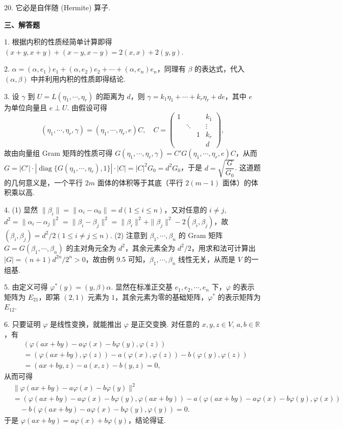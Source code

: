 \documentclass[UTF8, 12pt, fontset=fandol, oneside]{ctexart}
\begin{document}
20. 它必是自伴随 (Hermite) 算子.

\noindent\textbf{三、解答题}

1. 根据内积的性质经简单计算即得 $(x+y,x+y)+(x-y,x-y)=2(x,x)+2(y,y)$.

2. $\alpha=(\alpha,e_1)e_1+(\alpha,e_2)e_2+\cdots+(\alpha,e_n)e_n$，同理有 $\beta$ 的表达式，代入 $(\alpha,\beta)$ 中并利用内积的性质即得结论.

3. 设 $\gamma$ 到 $U=L(\eta_1,\cdots,\eta_r)$ 的距离为 $d$，则 $\gamma=k_1\eta_1+\cdots+k_r\eta_r+de$，其中 $e$ 为单位向量且 $e\perp U$. 由假设可得
\[
(\eta_1,\cdots,\eta_r,\gamma)=(\eta_1,\cdots,\eta_r,e)C,\quad
C=\begin{pmatrix}
1&&&k_1\\
&\ddots&&\vdots\\
&&1&k_r\\
&&&d
\end{pmatrix},
\]
故由向量组 Gram 矩阵的性质可得 $G(\eta_1,\cdots,\eta_r,\gamma)=C'G(\eta_1,\cdots,\eta_r,e)C$，从而 $G=|C'|\cdot|\operatorname{diag}\{G(\eta_1,\cdots,\eta_r),1\}|\cdot|C|=|C|^2G_0=d^2G_0$，于是 $d=\sqrt{\dfrac{G}{G_0}}$. 这道题的几何意义是，一个平行 $2m$ 面体的体积等于其底（平行 $2(m-1)$ 面体）的体积乘以高.

4. (1) 显然 $\|\beta_i\|=\|\alpha_i-\alpha_0\|=d(1\le i\le n)$，又对任意的 $i\ne j$, $d^2=\|\alpha_i-\alpha_j\|^2=\|\beta_i-\beta_j\|^2=\|\beta_i\|^2+\|\beta_j\|^2-2(\beta_i,\beta_j)$，故 $(\beta_i,\beta_j)=d^2/2(1\le i\ne j\le n)$. (2) 注意到 $\beta_1,\cdots,\beta_n$ 的 Gram 矩阵 $G=G(\beta_1,\cdots,\beta_n)$ 的主对角元全为 $d^2$，其余元素全为 $d^2/2$，用求和法可计算出 $|G|=(n+1)d^{2n}/2^n>0$，故由例 9.5 可知，$\beta_1,\cdots,\beta_n$ 线性无关，从而是 $V$ 的一组基.

5. 由定义可得 $\varphi^*(y)=(y,\beta)\alpha$. 显然在标准正交基 $e_1,e_2,\cdots,e_n$ 下，$\varphi$ 的表示矩阵为 $E_{21}$，即第 $(2,1)$ 元素为 $1$，其余元素为零的基础矩阵，$\varphi^*$ 的表示矩阵为 $E_{12}$.

6. 只要证明 $\varphi$ 是线性变换，就能推出 $\varphi$ 是正交变换. 对任意的 $x,y,z\in V$, $a,b\in\mathbb{R}$，有
\[
\begin{aligned}
&(\varphi(ax+by)-a\varphi(x)-b\varphi(y),\varphi(z))\\
&=(\varphi(ax+by),\varphi(z))-a(\varphi(x),\varphi(z))-b(\varphi(y),\varphi(z))\\
&=(ax+by,z)-a(x,z)-b(y,z)=0,
\end{aligned}
\]
从而可得
\[
\begin{aligned}
&\|\varphi(ax+by)-a\varphi(x)-b\varphi(y)\|^2\\
&=(\varphi(ax+by)-a\varphi(x)-b\varphi(y),\varphi(ax+by))
-a(\varphi(ax+by)-a\varphi(x)-b\varphi(y),\varphi(x))\\
&\quad -b(\varphi(ax+by)-a\varphi(x)-b\varphi(y),\varphi(y))=0.
\end{aligned}
\]
于是 $\varphi(ax+by)=a\varphi(x)+b\varphi(y)$，结论得证.
\end{document}
